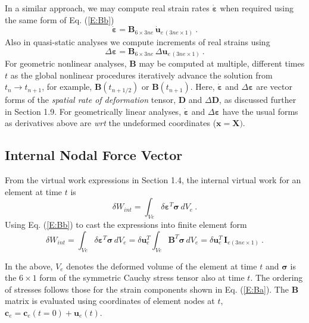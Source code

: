 \documentclass[11pt]{report}
\numberwithin{equation}{section}
\newcommand{\bmf } {\boldsymbol }  %
\newcommand{\ti}{\emph}
\newcommand{\nid}{\noindent}
\newcommand{\vareps}{\varepsilon}
\begin{document}
In a similar approach, we may compute real strain rates $\dot{\bmf{\vareps}}$ 
when required using
the same form of Eq. (\ref{E:Bb})
%
\begin{equation}\label{E:Be}
 \dot{\bmf{\vareps}} = \mathbf{B}_{6\times 3ne} \,  \dot{\bmf{u}}_{e\,(3ne\times1)}\ .
\end{equation}
%
Also in quasi-static analyses we compute increments of real strains using
%
\begin{equation}\label{E:Bf}
 \Delta \bmf{\vareps} = \mathbf{B}_{6\times 3ne} \,  \Delta{\bmf{u}}_{e\,(3ne\times1)}\ .
\end{equation}
%
For geometric nonlinear analyses, 
$\mathbf{B}$ may be computed at multiple, different times $t$ as the global nonlinear
procedures iteratively advance the solution from $t_n \rightarrow t_{n+1}$,
for example, $\mathbf{B}(t_{n+1/2})$ or $\mathbf{B}(t_{n+1})$. Here, $\dot{\bmf{\vareps}}$ 
and $\Delta \bmf{\vareps}$ are vector forms of the \ti{spatial rate of deformation} tensor, $\mathbf{D}$
and $\Delta\mathbf{D}$, as discussed further in Section 1.9. For geometrically linear analyses,
 $\dot{\bmf{\vareps}}$ and $\Delta \bmf{\vareps}$ have the  usual forms as derivatives above are \ti{wrt}
 the undeformed coordinates ($\bmf{x}=\bmf{X})$.

\subsection{Internal Nodal Force Vector}
\nid From the virtual work expressions in Section 1.4, the internal virtual work 
for an element at time $t$ is 
%
\begin{equation}\label{E:IFVa}
 \delta W_{int} = \int_{Ve} \delta \bmf{\vareps}^T \bmf{\sigma} \, dV_e\ .
\end{equation}
%
\nid Using Eq. (\ref{E:Bb}) to cast the expressions into finite element form
\begin{equation}\label{E:IFVb}
 \delta W_{int} = \int_{Ve} \delta \bmf{\vareps}^T \bmf{\sigma} \, dV_e = 
 \delta \bmf{u}_e^T\int_{Ve} \mathbf{B}^T \bmf{\sigma} \, dV_e =
  \delta \bmf{u}_e^T \, \bmf{I}_{e(3ne\times1)} \ .
\end{equation}

In the above, $V_e$ denotes the deformed volume of the element at time
$t$ and $\bmf{\sigma}$ is the $6\times 1$ form of the symmetric Cauchy stress
tensor also at time $t$. The ordering of stresses follows those for the strain
components shown in Eq. (\ref{E:Ba}). The $\mathbf{B}$ matrix is evaluated using coordinates of 
element nodes at $t$, $\bmf{c}_e= \bmf{c}_e(t=0) +\bmf{u}_e(t)$.
\end{document}
